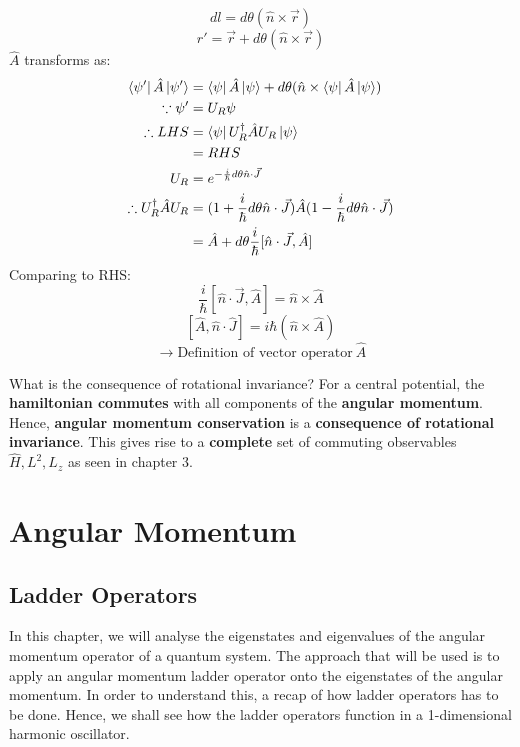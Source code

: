 \documentclass{article}
\begin{document}
\begin{flushleft}
$$dl=d\theta(\hat{n}\times\vec{r})$$
$$r'=\vec{r}+d\theta(\hat{n}\times\vec{r})$$
$\hat{A}$ transforms as:
\begin{align*}
\bra{\psi'}\hat{A}\ket{\psi'}&=\bra{\psi}\hat{A}\ket{\psi}+d\theta(\hat{n}\times\bra{\psi}\hat{A}\ket{\psi})\\
\because \psi'&=U_R\psi\\
\therefore LHS&=\bra{\psi}U^\dagger_R\hat{A}U_R\ket{\psi}\\
&=RHS\\
U_R&=e^{-\frac{i}{\hbar}d\theta\hat{n}\cdot\vec{J}}\\
\therefore U^\dagger_R\hat{A}U_R&=(1+\frac{i}{\hbar}d\theta\hat{n}\cdot\vec{J})\hat{A}(1-\frac{i}{\hbar}d\theta\hat{n}\cdot\vec{J})\\
&=\hat{A}+d\theta\frac{i}{\hbar}[\hat{n}\cdot\vec{J},\hat{A}]
\end{align*}
Comparing to RHS:
$$\frac{i}{\hbar}[\hat{n}\cdot\vec{J},\hat{A}]=\hat{n}\times\hat{A}$$
$$[\hat{A},\hat{n}\cdot\hat{J}]=i\hbar(\hat{n}\times\hat{A})$$
$$\rightarrow \text{Definition of vector operator}\ \hat{A}$$

What is the consequence of rotational invariance? For a central potential, the \textbf{hamiltonian commutes} with all components of the \textbf{angular momentum}. Hence, \textbf{angular momentum conservation} is a \textbf{consequence of rotational invariance}. This gives rise to a \textbf{complete} set of commuting observables ${\hat{H},L^2,L_z}$ as seen in chapter 3.
\pagebreak

\section{Angular Momentum}
\subsection{Ladder Operators}
In this chapter, we will analyse the eigenstates and eigenvalues of the angular momentum operator of a quantum system. The approach that will be used is to apply an angular momentum ladder operator onto the eigenstates of the angular momentum. In order to understand this, a recap of how ladder operators has to be done. Hence, we shall see how the ladder operators function in a 1-dimensional harmonic oscillator.


\end{flushleft}
\end{document}
